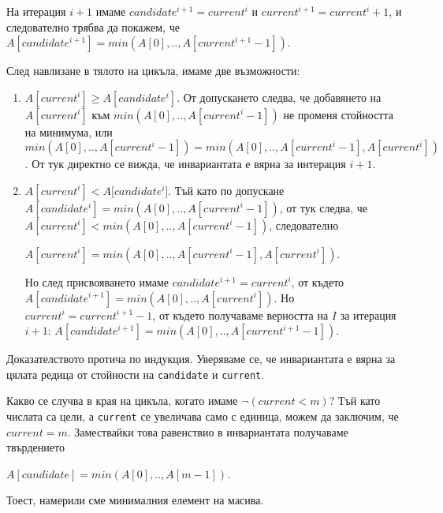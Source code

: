 \documentclass[12pt,a4paper]{article}
\newcommand{\code}[1]{\texttt{#1}}
\begin{document}
\begin{mdframed}[hidealllines=true,backgroundcolor=gray!20]
На итерация $i+1$ имаме  $candidate^{i+1}=current^{i}$ и $current^{i+1}=current^{i}+1$, и следователно трябва да покажем, че $A[candidate^{i+1}]=min(A[0],..,A[current^{i+1}-1])$.

След навлизане в тялото на цикъла, имаме две възможности:
\begin{enumerate}[label=\arabic*)]
  \item $A[current^i]\geq A[candidate^i]$. От допускането следва, че добавянето на $A[current^i]$ към $min(A[0],..,A[current^i-1])$ не променя стойността на минимума, или $min(A[0],..,A[current^i-1])=min(A[0],..,A[current^i-1],A[current^i])$. От тук директно се вижда, че инвариантата е вярна за интерация $i+1$.
  \item $A[current^i] < A[candidate^i$]. Тъй като по допускане $A[candidate^i] = min(A[0], .., A[current^i-1])$, от тук следва, че $A[current^i] < min(A[0], .., A[current^i-1])$, следователно

   $A[current^i] = min(A[0], .., A[current^i-1], A[current^i])$.

   Но след присвояването имаме $candidate^{i+1} = current^i$, от където $A[candidate^{i+1}] = min(A[0],..,A[current^i])$. Но $current^i = current^{i+1}-1$, от където получаваме верността на $I$ за итерация $i+1$: $A[candidate^{i+1}] = min(A[0], .., A[current^{i+1}-1])$.

\end{enumerate}
  Доказателството протича по индукция. Уверяваме се, че инвариантата е вярна за цялата редица от стойности на \code{candidate} и \code{current}.

  Какво се случва в края на цикъла, когато имаме $\neg(current<m)$? Тъй като числата са цели, а \code{current} се увеличава само с единица, можем да заключим, че $current=m$. Замествайки това равенствио в инвариантата получаваме твърдението

  $A[candidate] = min(A[0], .., A[m-1])$.

  Тоест, намерили сме минималния елемент на масива.
\end{mdframed}
\end{document}
